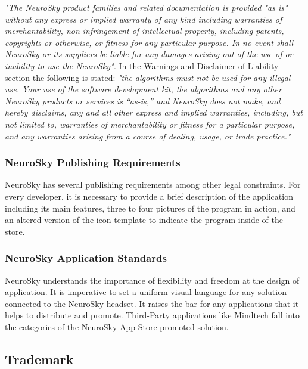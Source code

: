 \documentclass[letterpaper,10pt]{article}
\let\oldsubsection\subsection
\renewcommand{\subsection}{\def\cursectioning{subsection}\oldsubsection}
\begin{document}
\textit{"The NeuroSky product families and related documentation is provided "as is" without any express or implied warranty of any kind including warranties of merchantability, non-infringement of intellectual property, including patents, copyrights or otherwise, or fitness for any particular purpose. In no event shall NeuroSky or its suppliers be liable for any damages arising out of the use of or inability to use the NeuroSky".} In the Warnings and Disclaimer of Liability section the following is stated: \textit{ "the algorithms must not be used for any illegal use. Your use of the software development kit, the algorithms and any other NeuroSky products or services is “as-is,” and NeuroSky does not make, and hereby disclaims, any and all other express and implied warranties, including, but not limited to, warranties of merchantability or fitness for a particular purpose, and any warranties arising from a course of dealing, usage, or trade practice."} \cite{about_neurosky}

\subsubsection{NeuroSky Publishing Requirements}

NeuroSky has several publishing requirements among other legal constraints. For every developer, it is necessary to provide a brief description of the application including its main features, three to four pictures of the program in action, and an altered version of the icon template to indicate the program inside of the store. \cite{publish}

\subsubsection{NeuroSky Application Standards}

NeuroSky understands the importance of flexibility and freedom at the design of application. It is imperative to set a uniform visual language for any solution connected to the NeuroSky headset. It raises the bar for any applications that it helps to distribute and promote. Third-Party applications like Mindtech fall into the categories of the NeuroSky App Store-promoted solution. \cite{app_standard}


\subsection{Trademark}
\end{document}
